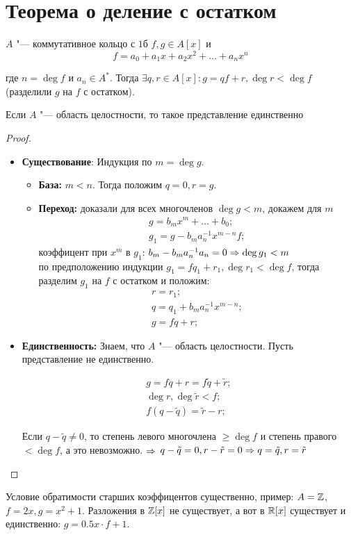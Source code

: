 \section{Теорема о деление с остатком}
\begin{theorem}{}
	$A$ "--- коммутативное кольцо с $1$б
	$f, g \in A[x]$ и
	\[f = a_0 + a_1x + a_2x^2 + \dots + a_nx^n\]
	
	где $n = \deg f$ и $a_n \in A^*$. Тогда $\exists q, r \in A[x] \colon  g = qf + r, \deg r < \deg f$
	(разделили $g$ на $f$ с остатком).
\end{theorem}

\begin{Rem}
	Если $A$ "--- область целостности, то такое представление единственно
\end{Rem}

\begin{proof}
\begin{itemize}
\item \textbf{Существование}:
	Индукция по $m = \deg g$.
	\begin{itemize}
	\item
	\textbf{База:} $m < n$. Тогда положим $q=0, r=g$.
	\item
	\textbf{Переход:} доказали для всех многочленов $\deg g < m$, докажем для $m$
	\begin{gather*}
	g = b_mx^m + \dots + b_0; \\
	g_1 = g - b_m a_n^{-1}x^{m-n}f;
	\end{gather*}
	коэффицент при $x^m$ в $g_1$: $b_m - b_m a_n^{-1} a_n = 0 \Rightarrow \deg g_1 < m$\\
	по предположению индукции $g_1 = fq_1 + r_1, \deg r_1	< \deg f $, тогда разделим $g_1$ на $f$ с остатком и положим:
	\begin{gather*}
		r = r_1; \\
		q = q_1 + b_m a_n^{-1} x^{m-n}; \\
		g = fq	+ r;
	\end{gather*}
	\end{itemize}

\item	
	\textbf{Единственность:}
	Знаем, что $A$ "--- область целостности. Пусть представление не единственно.

	\begin{gather*}
	g = fq + r = f \tilde{q} + \tilde{r}; \\
	\deg r, \deg \tilde{r} < f; \\
	f (q - \tilde{q}) = \tilde{r} - r;
	\end{gather*}

	Если $q - \tilde{q} \neq 0$, то степень левого многочлена $\geq \deg f$ и степень правого $< \deg f$, а
	это невозможно. $\Rightarrow$
	$q -\tilde{q} = 0, r - \tilde{r} = 0 \Rightarrow q = \tilde{q}, r = \tilde{r}$
\end{itemize}
\end{proof}

\begin{Rem}
	Условие обратимости старших коэффицентов существенно, пример:
	$A = \mathbb{Z}$, $f = 2x, g = x^2 + 1$. Разложения в $\mathbb{Z}[x]$ не существует, а вот в $\mathbb{R}[x]$ существует
	и единственно: $g=0.5x \cdot f + 1$.
\end{Rem}
